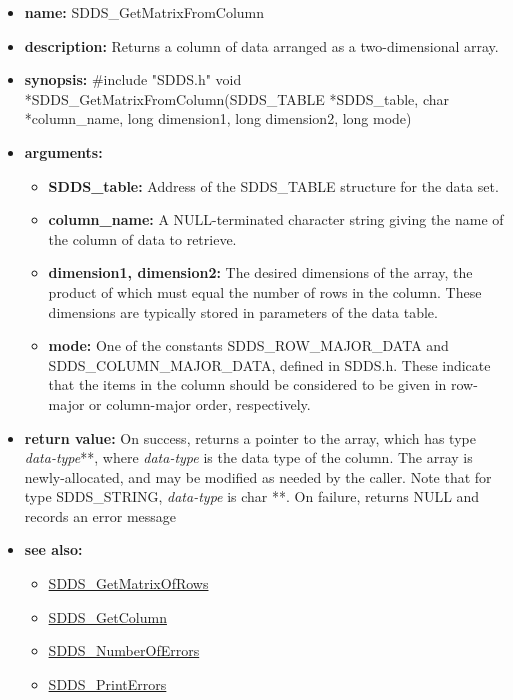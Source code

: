 \documentclass[11pt]{article}
\newcommand{\progref}[1]{\hyperref{SDDS_#1}{{\tt SDDS\_#1} (}{)}{SDDS_#1}}
\begin{document}
\begin{itemize}
\item {\bf name:}\newline
SDDS\_GetMatrixFromColumn
\item {\bf description:}\newline
Returns a column of data arranged as a two-dimensional array.
\item {\bf synopsis:} \#include "SDDS.h"\newline
void *SDDS\_GetMatrixFromColumn(SDDS\_TABLE *SDDS\_table, char *column\_name, long dimension1, long dimension2, long mode)
\item {\bf arguments:}
\begin{itemize}
\item {\bf SDDS\_table:} Address of the SDDS\_TABLE structure for the data set.
\item {\bf column\_name:} A NULL-terminated character string giving the name of the column of data to retrieve.
\item {\bf dimension1, dimension2:} The desired dimensions of the array, the product of which must equal the number of rows in the column. These dimensions are typically stored in parameters of the data table.
\item {\bf mode:} One of the constants SDDS\_ROW\_MAJOR\_DATA and SDDS\_COLUMN\_MAJOR\_DATA, defined in SDDS.h. These indicate that the items in the column should be considered to be given in row-major or column-major order, respectively.
\end{itemize}
\item {\bf return value:}\newline
On success, returns a pointer to the array, which has type {\em data-type}**, where {\em data-type} is the data type of the column. The array is newly-allocated, and may be modified as needed by the caller. Note that for type SDDS\_STRING, {\em data-type} is char **.\newline
\newline
On failure, returns NULL and records an error message
\item {\bf see also:}
\begin{itemize}
\item \progref{GetMatrixOfRows}
\item \progref{GetColumn}
\item \progref{NumberOfErrors}
\item \progref{PrintErrors}
\end{itemize}
\end{itemize}
\end{document}
